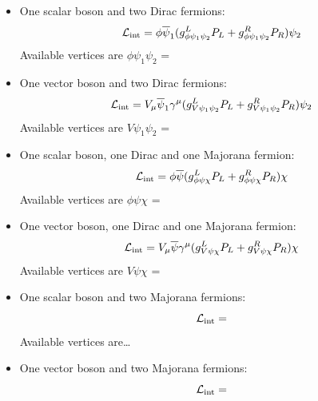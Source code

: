 \documentclass[a4paper,10pt,oneside]{book}
\begin{document}
\begin{itemize}
\item One scalar boson and two Dirac fermions:
\begin{equation}
{\cal L}_{\rm int} = \phi \overline{\psi}_1 ( g^L_{\phi\psi_1\psi_2} P_L +
g^R_{\phi\psi_1\psi_2} P_R ) \psi_2
\end{equation}
Available vertices are $\phi\psi_1\psi_2$ = 

\item One vector boson and two Dirac fermions:
\begin{equation}
{\cal L}_{\rm int} = V_\mu \overline{\psi}_1 \gamma^\mu
( g^L_{V\psi_1\psi_2} P_L + g^R_{V\psi_1\psi_2} P_R ) \psi_2
\end{equation}
Available vertices are $V\psi_1\psi_2$ = 

\item One scalar boson, one Dirac and one Majorana fermion:
\begin{equation}
  {\cal L}_{\rm int} = \phi \overline{\psi} 
  ( g^L_{\phi\psi\chi} P_L + g^R_{\phi\psi\chi} P_R ) \chi
\end{equation}
Available vertices are $ \phi\psi\chi$ = 

\item One vector boson, one Dirac and one Majorana fermion:
\begin{equation}
  {\cal L}_{\rm int} = V_\mu \overline{\psi} \gamma^\mu 
  ( g^L_{V\psi\chi} P_L + g^R_{V\psi\chi} P_R ) \chi
\end{equation}
Available vertices are $V\psi\chi$ = 

\item One scalar boson and two Majorana fermions:
\begin{equation}
{\cal L}_{\rm int} = 
\end{equation}
Available vertices are\ldots

\item One vector boson and two Majorana fermions:
\begin{equation}
{\cal L}_{\rm int} = 
\end{equation}
\end{itemize}

\end{document}
